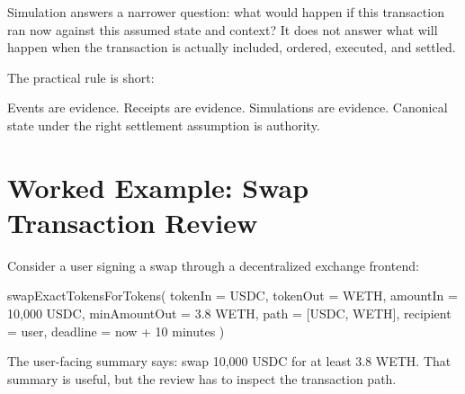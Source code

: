 Simulation answers a narrower question: what would happen if this transaction ran now against this assumed state and context? It does not answer what will happen when the transaction is actually included, ordered, executed, and settled.

The practical rule is short:

\begin{codeblock}
Events are evidence.
Receipts are evidence.
Simulations are evidence.
Canonical state under the right settlement assumption is authority.
\end{codeblock}

\section{Worked Example: Swap Transaction Review}

Consider a user signing a swap through a decentralized exchange frontend:

\begin{codeblock}
swapExactTokensForTokens(
    tokenIn = USDC,
    tokenOut = WETH,
    amountIn = 10,000 USDC,
    minAmountOut = 3.8 WETH,
    path = [USDC, WETH],
    recipient = user,
    deadline = now + 10 minutes
)
\end{codeblock}

The user-facing summary says: swap 10,000 USDC for at least 3.8 WETH. That summary is useful, but the review has to inspect the transaction path.

